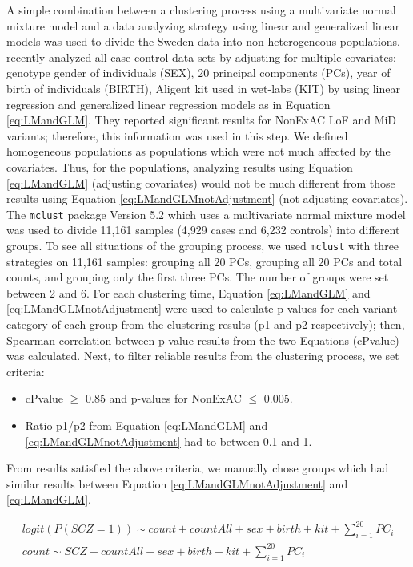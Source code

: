 \documentclass[]{article}
\begin{document}
A simple combination between a clustering process using a multivariate normal
mixture model and a data analyzing
strategy using linear and generalized linear models was used to divide
the Sweden data into non-heterogeneous populations.
\cite{genovese2016increased} recently analyzed all case-control data sets by
adjusting for multiple covariates: genotype gender of individuals (SEX), 20
principal components (PCs), year of birth of individuals (BIRTH), Aligent kit
used in wet-labs (KIT) by using linear regression and generalized
linear regression  models
as in Equation \ref{eq:LMandGLM}. They reported significant results
for NonExAC LoF and MiD variants; therefore, this information was used
in this step.
We defined homogeneous populations as populations which were not much
affected by the covariates. Thus, for the populations, analyzing
results using Equation \ref{eq:LMandGLM} (adjusting covariates)
would not be much different from those results using Equation
\ref{eq:LMandGLMnotAdjustment} (not adjusting covariates). The \texttt{mclust}
package Version 5.2 \citep{fraley1999mclust} which uses a multivariate
normal mixture model was used to divide 11,161
samples (4,929 cases and 6,232 controls) into different
groups. To see all situations of the grouping process, we used
\texttt{mclust} with three strategies on 11,161 samples: grouping all
20 PCs, grouping all 20 PCs and total counts, and grouping only the first three PCs.
The number of groups were set between 2 and 6. For each clustering
time, Equation \ref{eq:LMandGLM} and \ref{eq:LMandGLMnotAdjustment} were used
to calculate p values for each variant category of each group from the
clustering results (p1 and p2 respectively); then, Spearman correlation \citep{spearman1904proof} between p-value results
from the two Equations (cPvalue) was calculated. Next, to filter
reliable results from the clustering process, we set criteria:

\begin{itemize}
\item cPvalue $\ge$ 0.85 and p-values for NonExAC $\le$ 0.005.
\item Ratio p1/p2 from Equation \ref{eq:LMandGLM} and
  \ref{eq:LMandGLMnotAdjustment} had to between 0.1 and 1.
\end{itemize}

From results satisfied the above criteria, we manually chose groups
which had similar results between Equation
\ref{eq:LMandGLMnotAdjustment} and \ref{eq:LMandGLM}.


\begin{equation} \label{eq:LMandGLM}
\begin{array}{ll}
logit(P(SCZ = 1)) \sim count + countAll + sex + birth + kit +
  \sum \limits_{i=1}^{20} PC_i \\
count \sim SCZ + countAll + sex + birth + kit + \sum \limits_{i=1}^{20} PC_i
\end{array}
\end{equation}
\end{document}
